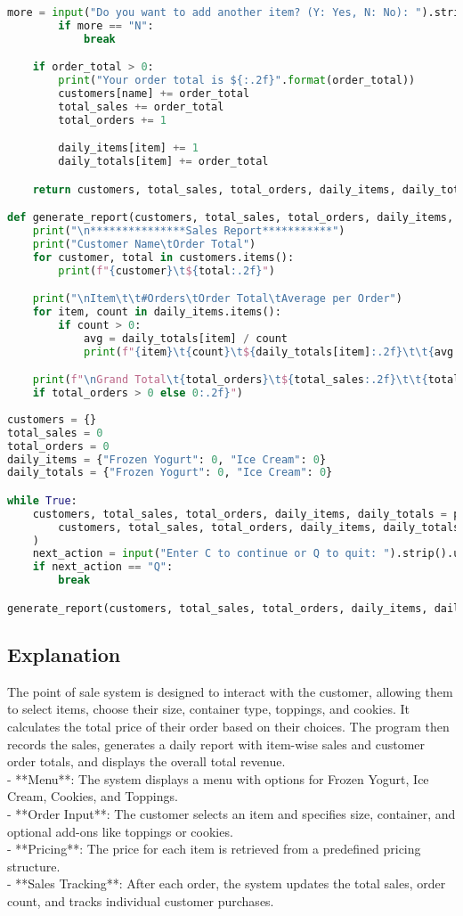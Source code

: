 \documentclass{article}
\begin{document}
\begin{lstlisting}[language=Python]
        more = input("Do you want to add another item? (Y: Yes, N: No): ").strip().upper()
        if more == "N":
            break

    if order_total > 0:
        print("Your order total is ${:.2f}".format(order_total))
        customers[name] += order_total
        total_sales += order_total
        total_orders += 1

        daily_items[item] += 1
        daily_totals[item] += order_total

    return customers, total_sales, total_orders, daily_items, daily_totals

def generate_report(customers, total_sales, total_orders, daily_items, daily_totals):
    print("\n***************Sales Report***********")
    print("Customer Name\tOrder Total")
    for customer, total in customers.items():
        print(f"{customer}\t${total:.2f}")

    print("\nItem\t\t#Orders\tOrder Total\tAverage per Order")
    for item, count in daily_items.items():
        if count > 0:
            avg = daily_totals[item] / count
            print(f"{item}\t{count}\t${daily_totals[item]:.2f}\t\t{avg:.2f}")

    print(f"\nGrand Total\t{total_orders}\t${total_sales:.2f}\t\t{total_sales / total_orders 
    if total_orders > 0 else 0:.2f}")
    
customers = {}
total_sales = 0
total_orders = 0
daily_items = {"Frozen Yogurt": 0, "Ice Cream": 0}
daily_totals = {"Frozen Yogurt": 0, "Ice Cream": 0}

while True:
    customers, total_sales, total_orders, daily_items, daily_totals = process_order(
        customers, total_sales, total_orders, daily_items, daily_totals
    )
    next_action = input("Enter C to continue or Q to quit: ").strip().upper()
    if next_action == "Q":
        break

generate_report(customers, total_sales, total_orders, daily_items, daily_totals)
\end{lstlisting}

\subsection{Explanation}
The point of sale system is designed to interact with the customer, allowing them to select items, choose their size, container type, toppings, and cookies. It calculates the total price of their order based on their choices. The program then records the sales, generates a daily report with item-wise sales and customer order totals, and displays the overall total revenue.\\
- **Menu**: The system displays a menu with options for Frozen Yogurt, Ice Cream, Cookies, and Toppings.\\
- **Order Input**: The customer selects an item and specifies size, container, and optional add-ons like toppings or cookies.\\
- **Pricing**: The price for each item is retrieved from a predefined pricing structure.\\
- **Sales Tracking**: After each order, the system updates the total sales, order count, and tracks individual customer purchases.
\end{document}
